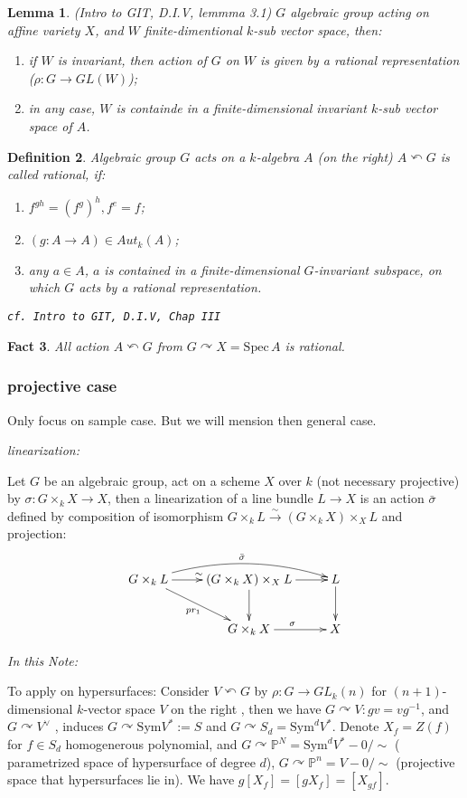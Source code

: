 \documentclass{article}
\newtheorem{defn}{Definition}[section]
\newtheorem{lem}[defn]{Lemma}
\newtheorem{fact}[defn]{Fact}
\newcommand{\Spec}{\mathrm{Spec}\,}
\newcommand{\isoto}{\xrightarrow{\sim}}
\begin{document}
\begin{lem}(Intro to GIT, D.I.V, lemmma 3.1)
	$ G $ algebraic group acting on affine variety $ X $, and $ W $  finite-dimentional $ k $-sub vector space, then:
	\begin{enumerate}
		\item if $ W $ is invariant, then action of $ G $ on $ W $ is given by a rational representation ($ \rho: G\to GL(W) $);
		\item in any case, $ W $ is containde in a finite-dimensional invariant $ k $-sub vector space of $ A $. 
	\end{enumerate}
\end{lem}
\begin{defn}
	Algebraic group $ G $ acts on a $ k $-algebra $ A $ (on the right) $ A\curvearrowleft G $ is called rational, if:
	\begin{enumerate}
		\item $ f^{gh}=(f^g)^h, f^e=f $;
		\item $ (g:A\to A)\in Aut_k(A) $;
		\item any $ a\in A $, $ a $ is contained in a finite-dimensional $ G $-invariant subspace, on which $ G $ acts by a rational representation.
	\end{enumerate}
	\texttt{cf. Intro to GIT, D.I.V, Chap III}
\end{defn}

\begin{fact}
	All action $ A\curvearrowleft G $ from $ G\curvearrowright X=\Spec A $ is rational.
\end{fact}
\subsubsection{projective case}
Only focus on sample case. But we will mension then general case.

\emph{linearization:}

Let $ G $ be an algebraic group, act on a scheme  $ X $ over $ k $ (not necessary projective) by $ \sigma: G\times_kX\to X $, then a linearization of a line bundle $ L\to X $ is an action $ \bar{\sigma} $ defined by composition of isomorphism  $ G\times_kL\isoto (G\times_kX)\times_{X}L $ and projection:
$$ \xymatrix{
	G\times_kL\ar[r]^{\sim}\ar@/^3ex/[rr]^{\bar{\sigma}}\ar[rd]_{pr_1}&(G\times_kX)\times_{X}L\ar[r]\ar[d]&L\ar[d]\\
	&G\times_kX\ar[r]^{\sigma}&X
	} $$

\emph{In this Note:}

To apply on hypersurfaces: Consider $ V \curvearrowleft G $ by $ \rho: G\to GL_k(n) $ for $ (n+1) $-dimensional $ k $-vector space $ V $ on the right , then we have $ G\curvearrowright V: gv=vg^{-1} $, and $ G\curvearrowright V^\vee$ , induces $ G\curvearrowright \mathrm{Sym} V^* :=S$ and $ G\curvearrowright S_d=\mathrm{Sym}^dV^* $. Denote $ X_f=Z(f) $ for $ f\in S_d $ homogenerous polynomial, and $G\curvearrowright \mathbb{P}^N=\mathrm{Sym}^dV^*-0/\sim $ ( parametrized space of hypersurface of degree $ d $), $ G\curvearrowright \mathbb{P}^n=V-0/\sim $ (projective space that hypersurfaces lie in). We have $ g[X_f]=[gX_f]=[X_{gf}] $.
\end{document}
